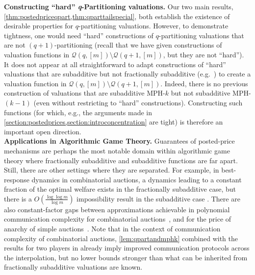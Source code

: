 \documentclass[11pt]{article}%
\numberwithin{theorem}{subsection}
\def\hmath$#1${\texorpdfstring{{\rmfamily\textit{#1}}}{#1}}
\begin{document}
\fi



\noindent\textbf{Constructing ``hard'' \hmath$q$-Partitioning valuations.}
Our two main results,
\cref{thm:postedpriceqpart,thm:qparttailspecial}, both establish the existence of desirable properties for $q$-partitioning valuations. However, to demonstrate tightness, one would need ``hard'' constructions of $q$-partitioning valuations that are not $(q+1)$-partitioning (recall that we have given constructions of valuation functions in $\mathcal{Q}(q,[m])\setminus \mathcal{Q}(q+1,[m])$, but they are not ``hard''). It does not appear at all straightforward to adapt constructions of ``hard'' valuations that are subadditive but not fractionally subadditive (e.g.~\cite{BhawalkarR11}) to create a valuation function in $\mathcal{Q}(q,[m])\setminus \mathcal{Q}(q+1,[m])$. Indeed, there is no previous construction of valuations that are subadditive MPH-$k$ but not subadditive MPH-$(k-1)$ (even without restricting to ``hard'' constructions). Constructing such functions (for which, e.g., the arguments made in \cref{section:postedprices,section:introconcentration} are tight) is therefore an important open direction.\\

\noindent\textbf{Applications in Algorithmic Game Theory.} Guarantees of posted-price mechanisms are perhaps the most notable domain within algorithmic game theory where fractionally subadditive and subadditive functions are far apart. Still, there are other settings where they are separated. For example, in best-response dynamics in combinatorial auctions, a dynamics leading to a constant fraction of the optimal welfare exists in the fractionally subadditive case, but there is a $O(\frac{\log \log m}{\log m})$ impossibility result in the subadditive case \cite{DuttingK22}. There are also constant-factor gaps between approximations achievable in polynomial communication complexity for combinatorial auctions~\cite{DobzinskiNS10,Feige09,EzraFNTW19}, and for the price of anarchy of simple auctions~\cite{RoughgardenST16}. Note that in the context of communication complexity of combinatorial auctions, \cref{lem:qpartandmphk} combined with the results for two players in 
\cite{EzraFNTW19} already imply improved communication protocols across the interpolation, but no lower bounds stronger than what can be inherited from fractionally subadditive valuations are known.\\
\end{document}
